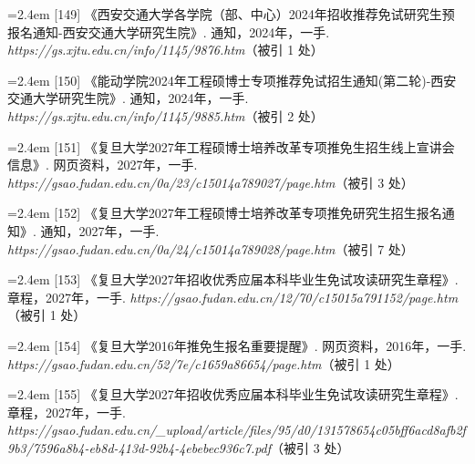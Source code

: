 {\vspace{0.6pt}
\vspace{3.5pt}\par
\nopagebreak\vspace{1pt}
\noindent\hangindent=2.4em \label{src:S0185}{\color{cAccent}[149]} 《西安交通大学各学院（部、中心）2024年招收推荐免试研究生预报名通知-西安交通大学研究生院》. 通知，2024年，一手. \textit{https://gs.xjtu.edu.cn/info/1145/9876.htm}（被引 1 处）\par
\vspace{0.6pt}
\noindent\hangindent=2.4em \label{src:S0186}{\color{cAccent}[150]} 《能动学院2024年工程硕博士专项推荐免试招生通知(第二轮)-西安交通大学研究生院》. 通知，2024年，一手. \textit{https://gs.xjtu.edu.cn/info/1145/9885.htm}（被引 2 处）\par
\vspace{0.6pt}
\vspace{3.5pt}\par
\nopagebreak\vspace{1pt}
\noindent\hangindent=2.4em \label{src:S0188}{\color{cAccent}[151]} 《复旦大学2027年工程硕博士培养改革专项推免生招生线上宣讲会信息》. 网页资料，2027年，一手. \textit{https://gsao.fudan.edu.cn/0a/23/c15014a789027/page.htm}（被引 3 处）\par
\vspace{0.6pt}
\noindent\hangindent=2.4em \label{src:S0189}{\color{cAccent}[152]} 《复旦大学2027年工程硕博士培养改革专项推免研究生招生报名通知》. 通知，2027年，一手. \textit{https://gsao.fudan.edu.cn/0a/24/c15014a789028/page.htm}（被引 7 处）\par
\vspace{0.6pt}
\noindent\hangindent=2.4em \label{src:S0190}{\color{cAccent}[153]} 《复旦大学2027年招收优秀应届本科毕业生免试攻读研究生章程》. 章程，2027年，一手. \textit{https://gsao.fudan.edu.cn/12/70/c15015a791152/page.htm}（被引 1 处）\par
\vspace{0.6pt}
\noindent\hangindent=2.4em \label{src:S0193}{\color{cAccent}[154]} 《复旦大学2016年推免生报名重要提醒》. 网页资料，2016年，一手. \textit{https://gsao.fudan.edu.cn/52/7e/c1659a86654/page.htm}（被引 1 处）\par
\vspace{0.6pt}
\noindent\hangindent=2.4em \label{src:S0194}{\color{cAccent}[155]} 《复旦大学2027年招收优秀应届本科毕业生免试攻读研究生章程》. 章程，2027年，一手. \textit{https://gsao.fudan.edu.cn/\_upload/article/files/95/d0/131578654c05bff6acd8afb2f9b3/7596a8b4-eb8d-413d-92b4-4ebebec936c7.pdf}（被引 3 处）\par
}
